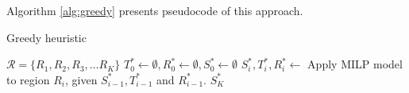 \documentclass[preprint,12pt]{elsarticle}
\begin{document}
{%
%
%
Algorithm \ref{alg:greedy} presents pseudocode of this approach. 
\begin{algorithm}
\small
\caption{Greedy heuristic}
\begin{algorithmic}
\Require $\mathcal{R} = \{R_1,R_2,R_3, \ldots R_K\}$ 
\State $T^\ast_0 \gets \emptyset, R^\ast_0 \gets \emptyset, S^\ast_0 \gets \emptyset$ 
\State $S^\ast_i, T^\ast_i, R^\ast_i \gets $ Apply MILP model to region $R_i$, given $S^\ast_{i-1},T^\ast_{i-1}$ and $R^\ast_{i-1}$.
\State{} 
\EndFor
\State \Return $S^\ast_K$
\end{algorithmic}
\label{alg:greedy}
\end{algorithm}

}
\end{document}
